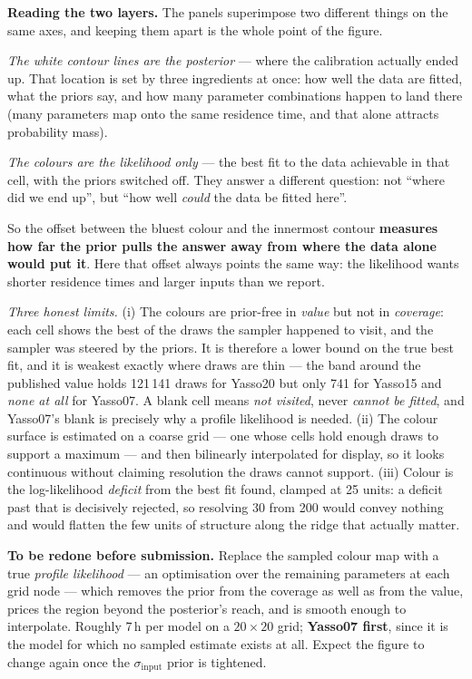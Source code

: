 \documentclass[11pt]{article}
\newcommand{\sinput}{\sigma_{\mathrm{input}}}
\begin{document}
\begin{methodnote}
\textbf{Reading the two layers.} The panels superimpose two different things on the same axes, and
keeping them apart is the whole point of the figure.

\emph{The white contour lines are the posterior} --- where the calibration actually ended up. That
location is set by three ingredients at once: how well the data are fitted, what the priors say, and
how many parameter combinations happen to land there (many parameters map onto the same residence
time, and that alone attracts probability mass).

\emph{The colours are the likelihood only} --- the best fit to the data achievable in that cell,
with the priors switched off. They answer a different question: not ``where did we end up'', but
``how well \emph{could} the data be fitted here''.

So the offset between the bluest colour and the innermost contour \textbf{measures how far the prior
pulls the answer away from where the data alone would put it}. Here that offset always points the
same way: the likelihood wants shorter residence times and larger inputs than we report.

\emph{Three honest limits.} (i) The colours are prior-free in \emph{value} but not in \emph{coverage}:
each cell shows the best of the draws the sampler happened to visit, and the sampler was steered by
the priors. It is therefore a lower bound on the true best fit, and it is weakest exactly where draws
are thin --- the band around the published value holds 121\,141 draws for Yasso20 but only 741 for
Yasso15 and \emph{none at all} for Yasso07. A blank cell means \emph{not visited}, never \emph{cannot
be fitted}, and Yasso07's blank is precisely why a profile likelihood is needed. (ii) The colour surface is estimated on a coarse grid --- one whose cells hold enough draws to
support a maximum --- and then bilinearly interpolated for display, so it looks continuous without
claiming resolution the draws cannot support. (iii) Colour is the log-likelihood \emph{deficit} from
the best fit found, clamped at 25 units: a deficit past that is decisively rejected, so resolving 30
from 200 would convey nothing and would flatten the few units of structure along the ridge that
actually matter.
\end{methodnote}

\begin{provisional}
\textbf{To be redone before submission.} Replace the sampled colour map with a true \emph{profile
likelihood} --- an optimisation over the remaining parameters at each grid node --- which removes the
prior from the coverage as well as from the value, prices the region beyond the posterior's reach,
and is smooth enough to interpolate. Roughly 7\,h per model on a $20\times20$ grid; \textbf{Yasso07
first}, since it is the model for which no sampled estimate exists at all. Expect the figure to change again
once the $\sinput$ prior is tightened.
\end{provisional}
\end{document}
